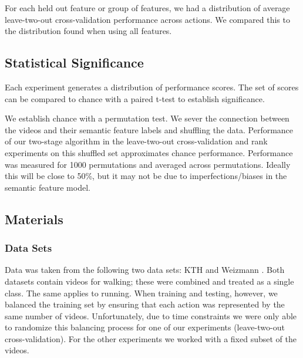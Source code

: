 \documentclass{article}
\begin{document}
For each held out feature or group of features, we had a distribution of average leave-two-out cross-validation performance across actions.  We compared this to the distribution found when using all features.

\label{fcomp}

\subsection{Statistical Significance}
Each experiment generates a distribution of performance scores. The set of scores can be compared to chance with a paired t-test to establish significance.

We establish chance with a permutation test. We sever the connection between the videos and their semantic feature labels and shuffling the data. Performance of our two-stage algorithm in the leave-two-out cross-validation and rank experiments on this shuffled set approximates chance performance. Performance was measured for 1000 permutations and averaged across permutations. Ideally this will be close to 50\%, but it may not be due to imperfections/biases in the semantic feature model.
\label{stats}

\subsection{Materials}
\subsubsection{Data Sets}
Data was taken from the following two data sets: KTH \cite{kth} and Weizmann \cite{weizmann}. Both datasets contain videos for walking; these were combined and treated as a single class. The same applies to running.  When training and testing, however, we balanced the training set by ensuring that each action was represented by the same number of videos. Unfortunately, due to time constraints we were only able to randomize this balancing process for one of our experiments (leave-two-out cross-validation). For the other experiments we worked with a fixed subset of the videos.
\end{document}

